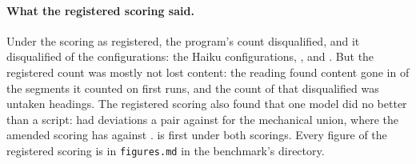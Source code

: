 \paragraph{What the registered scoring said.} Under the scoring as registered, the program's count disqualified, and it disqualified  of the  configurations: the Haiku configurations, \texttt{}, \texttt{} and \texttt{}. But the registered count was mostly not lost content: the reading found content gone in  of the  segments it counted on first runs, and the count of  that disqualified \texttt{} was  untaken headings. The registered scoring also found that one model did no better than a script: \texttt{} had  deviations a pair against  for the mechanical union, where the amended scoring has  against . \texttt{} is first under both scorings. Every figure of the registered scoring is in \texttt{figures.md} in the benchmark's directory.

